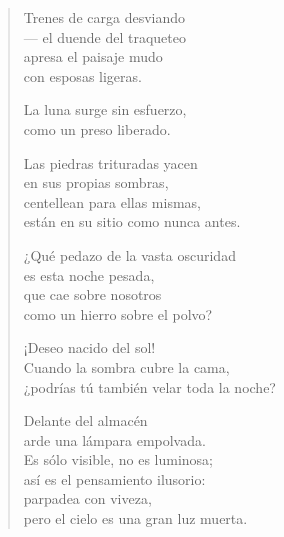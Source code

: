 \documentclass[11pt]{extbook}
\newcommand*{\centeredornament}{\centerline{\pgfornament[width=6cm]{88}}}
\begin{document}


\begin{verse}
  Trenes de carga desviando \\
  --- el duende del traqueteo \\
  apresa el paisaje mudo \\
  con esposas ligeras.

  La luna surge sin esfuerzo, \\
  como un preso liberado.

  Las piedras trituradas yacen \\
  en sus propias sombras, \\
  centellean para ellas mismas, \\
  están en su sitio como nunca antes.

  ¿Qué pedazo de la vasta oscuridad \\
  es esta noche pesada, \\
  que cae sobre nosotros \\
  como un hierro sobre el polvo?

  ¡Deseo nacido del sol! \\
  Cuando la sombra cubre la cama, \\
  ¿podrías tú también velar toda la noche?

  Delante del almacén \\
  arde una lámpara empolvada. \\
  Es sólo visible, no es luminosa; \\
  así es el pensamiento ilusorio: \\
  parpadea con viveza, \\
  pero el cielo es una gran luz muerta.
\end{verse}

\newpage

\vspace*{-15mm}
\centeredornament


\end{document}
